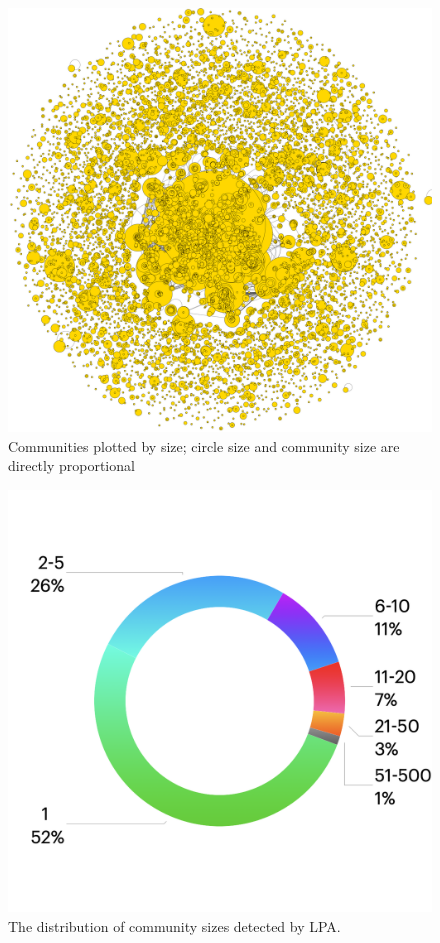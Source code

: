 \documentclass[conference]{IEEEtran}
\begin{document}
\begin{figure}[htbp]
 \centerline{\includegraphics[width=\columnwidth]{communities_by_size.png}}
 \caption{Communities plotted by size; circle size and community size are directly proportional}
 \label{fig:communitySizes}
\end{figure}

\begin{figure}[htbp]
 \centerline{\includegraphics[width=\columnwidth]{CommunitySizeDistribution.png}}
 \caption{The distribution of community sizes detected by LPA.}
 \label{fig:communitySizeDistribution}
\end{figure}
\end{document}
